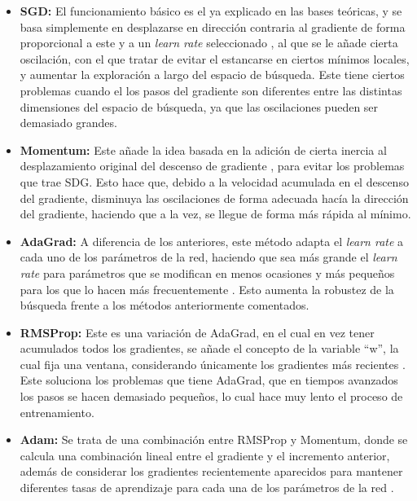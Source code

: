\begin{itemize}
    \item \textbf{SGD:} El funcionamiento básico es el ya explicado en las bases teóricas, y se basa simplemente en desplazarse en dirección contraria al gradiente de forma proporcional a este y a un \textit{learn rate} seleccionado \cite{NIPS2010_abea47ba}, al que se le añade cierta oscilación, con el que tratar de evitar el estancarse en ciertos mínimos locales, y aumentar la exploración a largo del espacio de búsqueda. Este tiene ciertos problemas cuando el los pasos del gradiente son diferentes entre las distintas dimensiones del espacio de búsqueda, ya que las oscilaciones pueden ser demasiado grandes.
    
    \item \textbf{Momentum:} Este añade la idea basada en la adición de cierta inercia al desplazamiento original del descenso de gradiente \cite{QIAN1999145}, para evitar los problemas que trae SDG. Esto hace que, debido a la velocidad acumulada en el descenso del gradiente, disminuya las oscilaciones de forma adecuada hacía la dirección del gradiente, haciendo que a la vez, se llegue de forma más rápida al mínimo.
    
    \item \textbf{AdaGrad:} A diferencia de los anteriores, este método adapta el \textit{learn rate} a cada uno de los parámetros de la red, haciendo que sea más grande el \textit{learn rate} para parámetros que se modifican en menos ocasiones y más pequeños para los que lo hacen más frecuentemente \cite{JMLR:v12:duchi11a}. Esto aumenta la robustez de la búsqueda frente a los métodos anteriormente comentados. 
    
    \item \textbf{RMSProp:} Este es una variación de AdaGrad, en el cual en vez tener acumulados todos los gradientes, se añade el concepto de la variable ``w'', la cual fija una ventana, considerando únicamente los gradientes más recientes \cite{hinton_srivastava_swersky}. Este soluciona los problemas que tiene AdaGrad, que en tiempos avanzados los pasos se hacen demasiado pequeños, lo cual hace muy lento el proceso de entrenamiento.
    
    \item \textbf{Adam:} Se trata de una combinación entre RMSProp y Momentum, donde se calcula una combinación lineal entre el gradiente y el incremento anterior, además de considerar los gradientes recientemente aparecidos para mantener diferentes tasas de aprendizaje para cada una de los parámetros de la red \cite{kingma2017adam}.
    
\end{itemize}


